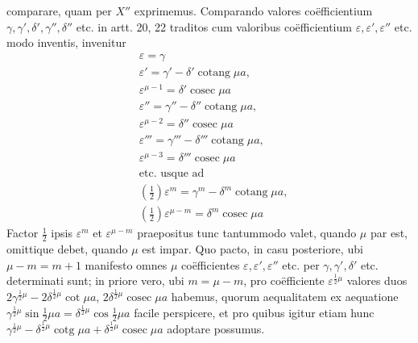comparare, quam per $X''$ exprimemus. Comparando valores coëfficientium
$\gamma,\gamma',\delta',\gamma'',\delta''$ etc. in artt. 20, 22 traditos cum valoribus coëfficientium
$\varepsilon,\varepsilon',\varepsilon''$ etc. modo inventis, invenitur
\[
\begin{aligned}
&\varepsilon=\gamma\\[5pt]
&\varepsilon'=\gamma'-\delta'\operatorname{cotang}\mu a,
\\[5pt]
&\varepsilon^{\mu-1}=\delta'\operatorname{cosec}\mu a\\[5pt]
&\varepsilon''=\gamma''-\delta''\operatorname{cotang}\mu a,
\\[5pt]
&\varepsilon^{\mu-2}=\delta''\operatorname{cosec}\mu a\\[5pt]
&\varepsilon'''=\gamma'''-\delta'''\operatorname{cotang}\mu a,
\\[5pt]
&\varepsilon^{\mu-3}=\delta'''\operatorname{cosec}\mu a\\[5pt]
&\text{etc. usque ad}\\[5pt]
&\left(\tfrac12\right)\varepsilon^m=\gamma^m-\delta^m\operatorname{cotang}\mu a,
\\[5pt]
&\left(\tfrac12\right)\varepsilon^{\mu-m}=\delta^m\operatorname{cosec}\mu a
\end{aligned}
\]
Factor $\tfrac12$ ipsis $\varepsilon^m$ et $\varepsilon^{\mu-m}$ praepositus tunc tantummodo valet, quando $\mu$ par
est, omittique debet, quando $\mu$ est impar. Quo pacto, in casu posteriore, ubi
$\mu-m=m+1$ manifesto omnes $\mu$ coëfficientes $\varepsilon,\varepsilon',\varepsilon''$ etc. per $\gamma,\gamma',\delta'$ etc.
determinati sunt; in priore vero, ubi $m=\mu-m$, pro coëfficiente $\varepsilon^{\frac12\mu}$ valores
duos $2\gamma^{\frac12\mu}-2\delta^{\frac12\mu}\cot\mu a$, $2\delta^{\frac12\mu}\operatorname{cosec}\mu a$ habemus, quorum aequalitatem ex aequatione
$\gamma^{\frac12\mu}\sin\tfrac12\mu a=\delta^{\frac12\mu}\cos\tfrac12\mu a$ facile perspicere, et pro quibus igitur etiam
hunc $\gamma^{\frac12\mu}-\delta^{\frac12\mu}\operatorname{cotg}\mu a+\delta^{\frac12\mu}\operatorname{cosec}\mu a$ adoptare possumus.

